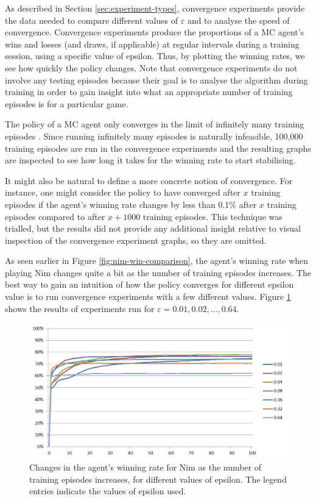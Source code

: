\documentclass[11pt,a4paper]{report}
\begin{document}
As described in Section \ref{sec:experiment-types}, convergence experiments provide the data needed to compare different values of $\varepsilon$ and to analyse the speed of convergence. Convergence experiments produce the proportions of a MC agent's wins and losses (and draws, if applicable) at regular intervals during a training session, using a specific value of epsilon. Thus, by plotting the winning rates, we see how quickly the policy changes. Note that convergence experiments do not involve any testing episodes because their goal is to analyse the algorithm during training in order to gain insight into what an appropriate number of training episodes is for a particular game.

The policy of a MC agent only converges in the limit of infinitely many training episodes \cite{rl-book}. Since running infinitely many episodes is naturally infeasible, 100,000 training episodes are run in the convergence experiments and the resulting graphs are inspected to see how long it takes for the winning rate to start stabilising.

It might also be natural to define a more concrete notion of convergence. For instance, one might consider the policy to have converged after $x$ training episodes if the agent's winning rate changes by less than 0.1\% after $x$ training episodes compared to after $x+1000$ training episodes. This technique was trialled, but the results did not provide any additional insight relative to visual inspection of the convergence experiment graphs, so they are omitted.

As seen earlier in Figure \ref{fig:nim-win-comparison}, the agent's winning rate when playing Nim changes quite a bit as the number of training episodes increases. The best way to gain an intuition of how the policy converges for different epsilon value is to run convergence experiments with a few different values. Figure \ref{nim-convergence-comparison} shows the results of experiments run for $\varepsilon = 0.01, 0.02,..., 0.64$.

\begin{figure}[htbp]
	\begin{center}
		\includegraphics[width=\linewidth]{Nim_PerformanceResults_Comparison_001_to_064.png}
		\caption{Changes in the agent's winning rate for Nim as the number of training episodes increases, for different values of epsilon. The legend entries indicate the values of epsilon used.}
		\label{nim-convergence-comparison}
	\end{center}
\end{figure}
\end{document}
